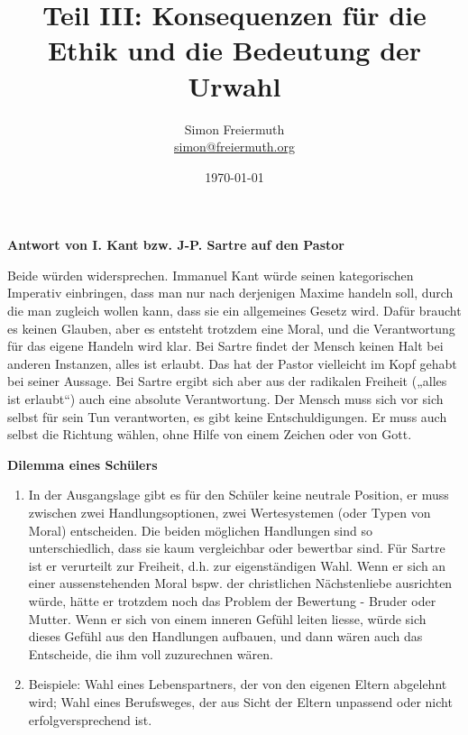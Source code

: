 \documentclass[12pt, letterpaper, twoside]{article}
\title{Teil III: Konsequenzen für die Ethik und die Bedeutung der Urwahl}
\author{Simon Freiermuth \\ \href{mailto:simon@freiermuth.org}{simon@freiermuth.org}}
\date{\today}
\begin{document}
\maketitle

\begin{flushleft}




\textbf{Antwort von I. Kant bzw. J-P. Sartre auf den Pastor}

\hfill

Beide würden widersprechen. Immanuel Kant würde seinen kategorischen Imperativ einbringen,
dass man nur nach derjenigen Maxime handeln soll, durch die man zugleich wollen kann,
dass sie ein allgemeines Gesetz wird. Dafür braucht es keinen Glauben, aber es entsteht trotzdem eine Moral,
und die Verantwortung für das eigene Handeln wird klar. Bei Sartre findet der Mensch keinen Halt
bei anderen Instanzen, alles ist erlaubt. Das hat der Pastor vielleicht im Kopf gehabt bei seiner Aussage.
Bei Sartre ergibt sich aber aus der radikalen Freiheit („alles ist erlaubt“) auch eine absolute Verantwortung.
Der Mensch muss sich vor sich selbst für sein Tun verantworten, es gibt keine Entschuldigungen.
Er muss auch selbst die Richtung wählen, ohne Hilfe von einem Zeichen oder von Gott.\\

\hfill

\textbf{Dilemma eines Schülers}

\begin{enumerate}[label=\alph*)]

\item
In der Ausgangslage gibt es für den Schüler keine neutrale
Position, er muss zwischen zwei Handlungsoptionen, zwei Wertesystemen
(oder Typen von Moral) entscheiden. Die beiden möglichen Handlungen sind
so unterschiedlich, dass sie kaum vergleichbar oder bewertbar sind.
Für Sartre ist er verurteilt zur Freiheit, d.h. zur eigenständigen Wahl.
Wenn er sich an einer aussenstehenden Moral bspw. der christlichen
Nächstenliebe ausrichten würde, hätte er trotzdem noch das Problem
der Bewertung - Bruder oder Mutter. Wenn er sich von einem inneren Gefühl leiten liesse, würde sich dieses Gefühl aus
den Handlungen aufbauen, und dann wären auch das Entscheide, die ihm voll zuzurechnen wären.

\item
Beispiele: Wahl eines Lebenspartners, der von den eigenen Eltern abgelehnt wird; Wahl eines Berufsweges, der aus Sicht der Eltern unpassend oder nicht erfolgversprechend ist.


\end{enumerate}
\end{flushleft}
\end{document}
